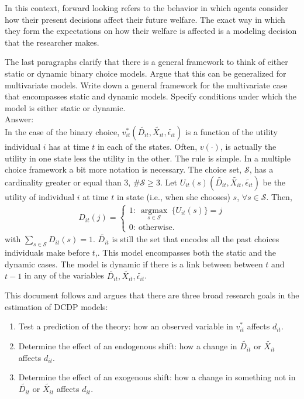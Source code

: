\begin{remark}
In this context, forward looking refers to the behavior in which agents consider how their present decisions affect their future welfare. The exact way in which they form the expectations on how their welfare is affected is a modeling decision that the researcher makes.
\end{remark}

\begin{exercise}
The last paragraphs clarify that there is a general framework to think of either static or dynamic binary choice models. Argue that this can be generalized for multivariate models. Write down a general framework for the multivariate case that encompasses static and dynamic models. Specify conditions under which the model is either static or dynamic.\\
\noindent Answer:\\
\noindent In the case of the binary choice, $v_{it}^* \left( \tilde{D_{it}}, \tilde{X_{it}}, \tilde{\epsilon_{it}} \right)$ is a function of the utility individual $i$ has at time $t$ in each of the states. Often, $v(\cdot)$, is actually the utility in one state less the utility in the other. The rule is simple. In a multiple choice framework a bit more notation is necessary. The choice set, $\mathcal{S}$, has a cardinality greater or equal than $3$, $\# \mathcal{S} \geq 3$. Let $U_{it}(s) \left( \tilde{D_{it}}, \tilde{X_{it}}, \tilde{\epsilon_{it}} \right)$ be the utility of individual $i$ at time $t$ in state (i.e., when she chooses) $s$, $\forall s \in \mathcal{S}$. Then,
 \begin{eqnarray}
   D_{it}(j) = \left\{
     \begin{array}{lr}
       1  : \ \underset{s \in \mathcal{S}}{\operatorname{argmax}} \ \{U_{it}(s)\} = j \\
       0  : \ \text{otherwise}. 
     \end{array}
   \right.
\end{eqnarray}
\noindent with $\sum \limits _{s \in \mathcal{S}} D_{it}(s) = 1$. $\tilde{D_{it}}$ is still the set that encodes all the past choices individuals make before $t$,. This model encompasses both the static and the dynamic cases. The model is dynamic if there is a link between between $t$ and $t-1$ in any of the variables $\tilde{D_{it}}, \tilde{X_{it}}, \tilde{\epsilon_{it}}$. 
\end{exercise}

\indent This document follows \citet{keane2011structural} and argues that there are three broad research goals in the estimation of DCDP models:
\begin{enumerate}
\item Test a prediction of the theory: how an observed variable in $v_{it}^*$ affects $d_{it}$.
\item Determine the effect of an endogenous shift: how a change in $\tilde{D_{it}}$ or $\tilde{X_{it}}$ affects $d_{it}$.
\item Determine the effect of an exogenous shift: how a change in something not in $\tilde{D_{it}}$ or $\tilde{X_{it}}$ affects $d_{it}$.
\end{enumerate}

